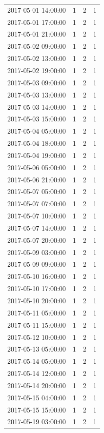 \begin{tabular}{lrrr}
2017-05-01 14:00:00 & 1 & 2 & 1 \\
2017-05-01 17:00:00 & 1 & 2 & 1 \\
2017-05-01 21:00:00 & 1 & 2 & 1 \\
2017-05-02 09:00:00 & 1 & 2 & 1 \\
2017-05-02 13:00:00 & 1 & 2 & 1 \\
2017-05-02 19:00:00 & 1 & 2 & 1 \\
2017-05-03 09:00:00 & 1 & 2 & 1 \\
2017-05-03 13:00:00 & 1 & 2 & 1 \\
2017-05-03 14:00:00 & 1 & 2 & 1 \\
2017-05-03 15:00:00 & 1 & 2 & 1 \\
2017-05-04 05:00:00 & 1 & 2 & 1 \\
2017-05-04 18:00:00 & 1 & 2 & 1 \\
2017-05-04 19:00:00 & 1 & 2 & 1 \\
2017-05-06 05:00:00 & 1 & 2 & 1 \\
2017-05-06 21:00:00 & 1 & 2 & 1 \\
2017-05-07 05:00:00 & 1 & 2 & 1 \\
2017-05-07 07:00:00 & 1 & 2 & 1 \\
2017-05-07 10:00:00 & 1 & 2 & 1 \\
2017-05-07 14:00:00 & 1 & 2 & 1 \\
2017-05-07 20:00:00 & 1 & 2 & 1 \\
2017-05-09 03:00:00 & 1 & 2 & 1 \\
2017-05-09 09:00:00 & 1 & 2 & 1 \\
2017-05-10 16:00:00 & 1 & 2 & 1 \\
2017-05-10 17:00:00 & 1 & 2 & 1 \\
2017-05-10 20:00:00 & 1 & 2 & 1 \\
2017-05-11 05:00:00 & 1 & 2 & 1 \\
2017-05-11 15:00:00 & 1 & 2 & 1 \\
2017-05-12 10:00:00 & 1 & 2 & 1 \\
2017-05-13 05:00:00 & 1 & 2 & 1 \\
2017-05-14 05:00:00 & 1 & 2 & 1 \\
2017-05-14 12:00:00 & 1 & 2 & 1 \\
2017-05-14 20:00:00 & 1 & 2 & 1 \\
2017-05-15 04:00:00 & 1 & 2 & 1 \\
2017-05-15 15:00:00 & 1 & 2 & 1 \\
2017-05-19 03:00:00 & 1 & 2 & 1 \\

\end{tabular}
